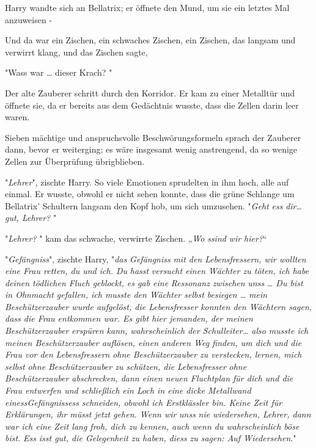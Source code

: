 {Harry wandte sich an Bellatrix; er öffnete den Mund, um sie ein letztes Mal anzuweisen -

Und da war ein Zischen, ein schwaches Zischen, ein Zischen, das langsam und verwirrt klang, und das Zischen sagte,

"Wass war … dieser Krach? "

Der alte Zauberer schritt durch den Korridor. Er kam zu einer Metalltür und öffnete sie, da er bereits aus dem Gedächtnis wusste, dass die Zellen darin leer waren.

Sieben mächtige und anspruchsvolle Beschwörungsformeln sprach der Zauberer dann, bevor er weiterging; es wäre insgesamt wenig anstrengend, da so wenige Zellen zur Überprüfung übrigblieben.

"\emph{Lehrer}", zischte Harry. So viele Emotionen sprudelten in ihm hoch, alle auf einmal. Er wusste, obwohl er nicht sehen konnte, dass die grüne Schlange um Bellatrix' Schultern langsam den Kopf hob, um sich umzusehen. "\emph{Geht} \emph{ess} \emph{dir… gut, Lehrer?} "

"\emph{Lehrer?} " kam das schwache, verwirrte Zischen. „\emph{Wo} \emph{ssind} \emph{wir hier?}“

"\emph{Gefängniss}", zischte Harry, "\emph{das} \emph{Gefängniss} \emph{mit den Lebensfressern, wir wollten eine Frau retten, du und ich. Du} \emph{hasst} \emph{versucht einen Wächter zu töten, ich habe deinen tödlichen Fluch geblockt, es gab eine} \emph{Ressonanz} \emph{zwischen} \emph{unss} \emph{… Du bist in Ohnmacht gefallen, ich musste den Wächter selbst besiegen … mein Beschützerzauber wurde aufgelöst, die Lebensfresser konnten den Wächtern sagen, dass die Frau entkommen war. Es gibt hier jemanden, der meinen Beschützerzauber erspüren kann, wahrscheinlich der Schulleiter… also musste ich meinen Beschützerzauber auflösen, einen anderen Weg finden, um dich und die Frau vor den} \emph{Lebensfressern} \emph{ohne Beschützerzauber zu verstecken, lernen, mich selbst ohne} \emph{Beschützerzauber zu schützen, die} \emph{Lebensfresser} \emph{ohne Beschützerzauber abschrecken, dann einen neuen Fluchtplan für dich und die Frau entwerfen und schließlich ein Loch in eine dicke Metallwand} \emph{einessGefängnissess} \emph{schneiden, obwohl ich Erstklässler bin. Keine Zeit für Erklärungen, ihr müsst jetzt gehen. Wenn wir} \emph{unss} \emph{nie wiedersehen, Lehrer, dann war ich eine Zeit lang froh, dich zu kennen, auch wenn du wahrscheinlich böse bist.} \emph{Ess} \emph{isst gut, die Gelegenheit zu haben,} \emph{diess} \emph{zu sagen: Auf Wiedersehen}."

}
